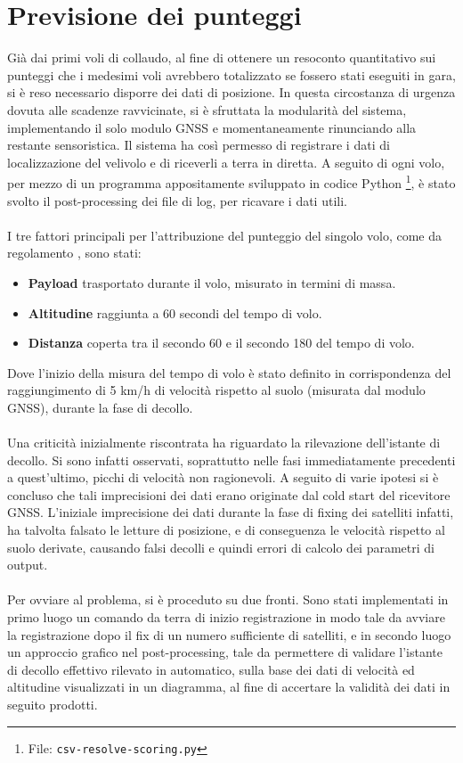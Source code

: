 \documentclass[12pt]{article}
\begin{document}
\section{Previsione dei punteggi}
Già dai primi voli di collaudo, al fine di ottenere un resoconto quantitativo sui punteggi che i medesimi voli avrebbero totalizzato se fossero stati eseguiti in gara, si è reso necessario disporre dei dati di posizione. In questa circostanza di urgenza dovuta alle scadenze ravvicinate, si è sfruttata la modularità del sistema, implementando il solo modulo GNSS e momentaneamente rinunciando alla restante sensoristica. Il sistema ha così permesso di registrare i dati di localizzazione del velivolo e di riceverli a terra in diretta. A seguito di ogni volo, per mezzo di un programma appositamente sviluppato in codice Python \footnote{File: \texttt{csv-resolve-scoring.py}}, è stato svolto il post-processing dei file di log, per ricavare i dati utili.
\\\\
I tre fattori principali per l'attribuzione del punteggio del singolo volo, come da regolamento \cite{regulation}, sono stati:
\begin{itemize}
\item \textbf{Payload} trasportato durante il volo, misurato in termini di massa.
\item \textbf{Altitudine} raggiunta a 60 secondi del tempo di volo.
\item \textbf{Distanza} coperta tra il secondo 60 e il secondo 180 del tempo di volo.
\end{itemize}
Dove l'inizio della misura del tempo di volo è stato definito in corrispondenza del raggiungimento di 5 km/h di velocità rispetto al suolo (misurata dal modulo GNSS), durante la fase di decollo.
\\\\
Una criticità inizialmente riscontrata ha riguardato la rilevazione dell'istante di decollo. Si sono infatti osservati, soprattutto nelle fasi immediatamente precedenti a quest'ultimo, picchi di velocità non ragionevoli. A seguito di varie ipotesi si è concluso che tali imprecisioni dei dati erano originate dal cold start del ricevitore GNSS. L'iniziale imprecisione dei dati durante la fase di fixing dei satelliti infatti, ha talvolta falsato le letture di posizione, e di conseguenza le velocità rispetto al suolo derivate, causando falsi decolli e quindi errori di calcolo dei parametri di output. 
\\\\
Per ovviare al problema, si è proceduto su due fronti. Sono stati implementati in primo luogo un comando da terra di inizio registrazione in modo tale da avviare la registrazione dopo il fix di un numero sufficiente di satelliti, e in secondo luogo un approccio grafico nel post-processing, tale da permettere di validare l'istante di decollo effettivo rilevato in automatico, sulla base dei dati di velocità ed altitudine visualizzati in un diagramma, al fine di accertare la validità dei dati in seguito prodotti. 
\end{document}
